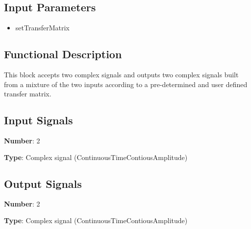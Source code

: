 \documentclass[../../sdf/tex/BPSK_system.tex]{subfiles}
\date{}
\begin{document}
\onlyinsubfile{\maketitle}

\subsection*{Input Parameters}

\begin{multicols}{2}
	\begin{itemize}
		\item setTransferMatrix
	\end{itemize}
\end{multicols}

\subsection*{Functional Description}

This block accepts two complex signals and outputs two complex signals built from a mixture of the two inputs according to a pre-determined and user defined transfer matrix.

\subsection*{Input Signals}

\textbf{Number}: 2

\textbf{Type}: Complex signal (ContinuousTimeContiousAmplitude)

\subsection*{Output Signals}

\textbf{Number}: 2

\textbf{Type}: Complex signal (ContinuousTimeContiousAmplitude)
\end{document}
